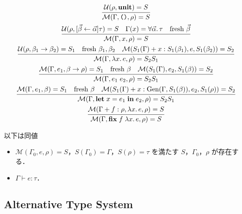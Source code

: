 \begin{gather*}
  \infer{\mathcal{M}(\Gamma, \text{\texttt{()}}, \rho) = S}{
    \mathcal{U}(\rho, \mathbf{unit}) = S
  }
  \\
  \infer{\mathcal{M}(\Gamma, x, \rho) = S}{
    \mathcal{U}(\rho, [\vec{\beta} \assign \vec{\alpha}]\tau) = S
    &
    \Gamma(x) = \forall \vec{\alpha}\ldotp \tau
    &
    \text{fresh $\vec{\beta}$}
  }
  \\
  \infer{\mathcal{M}(\Gamma, \lambda x\ldotp e, \rho) = S_2S_1}{
    \mathcal{U}(\rho, \beta_1 \to \beta_2) = S_1
    &
    \text{fresh $\beta_1, \beta_2$}
    &
    \mathcal{M}(S_1(\Gamma) + x:S_1(\beta_1), e, S_1(\beta_2)) = S_2
  }
  \\
  \infer{\mathcal{M}(\Gamma, e_1\;e_2, \rho) = S_2S_1}{
    \mathcal{M}(\Gamma, e_1, \beta \to \rho) = S_1
    &
    \text{fresh $\beta$}
    &
    \mathcal{M}(S_1(\Gamma), e_2, S_1(\beta)) = S_2
  }
  \\
  \infer{\mathcal{M}(\Gamma, \mathbf{let}\;x = e_1\;\mathbf{in}\;e_2, \rho) = S_2S_1}{
    \mathcal{M}(\Gamma, e_1, \beta) = S_1
    &
    \text{fresh $\beta$}
    &
    \mathcal{M}(S_1(\Gamma) + x:\mathrm{Gen}(\Gamma, S_1(\beta)), e_2, S_1(\rho)) = S_2
  }
  \\
  \infer{\mathcal{M}(\Gamma, \mathbf{fix}\;f\;\lambda x\ldotp e, \rho) = S}{
    \mathcal{M}(\Gamma + f:\rho, \lambda x\ldotp e, \rho) = S
  }
\end{gather*}

\begin{theorem}
  以下は同値
  \begin{itemize}
    \item $\mathcal{M}(\Gamma_0, e, \rho) = S$，$S(\Gamma_0) = \Gamma$，$S(\rho) = \tau$ を満たす $S$，$\Gamma_0$，$\rho$ が存在する．
    \item $\Gamma \vdash e: \tau$．
  \end{itemize}
\end{theorem}

\subsection{Alternative Type System}

